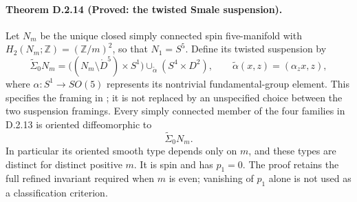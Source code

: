 \paragraph{Theorem D.2.14 (Proved: the twisted Smale suspension).}
Let $N_m$ be the unique closed simply connected spin five-manifold
with $H_2(N_m;\mathbb Z)=(\mathbb Z/m)^2$, so that $N_1=S^5$.
Define its twisted suspension by
\[
 \widetilde\Sigma_0 N_m
 =\bigl((N_m\setminus\mathring D^5)\times S^1\bigr)
       \cup_{\widetilde\alpha}(S^4\times D^2),
 \qquad \widetilde\alpha(x,z)=(\alpha_zx,z),
 \tag{D.S9}
\]
where $\alpha:S^1\to SO(5)$ represents its nontrivial
fundamental-group element. This specifies the framing in
\cite[Definition 5.1]{manGR25}; it is not replaced by an
unspecified choice between the two suspension framings.
Every simply connected member of the four families in
D.2.13 is oriented diffeomorphic to
\[
                         \widetilde\Sigma_0 N_m.
 \tag{D.S10}
\]
In particular its oriented smooth type depends only on $m$,
and these types are distinct for distinct positive $m$.
It is spin and has $p_1=0$. The proof retains the full
refined invariant required when $m$ is even; vanishing of
$p_1$ alone is not used as a classification criterion.
